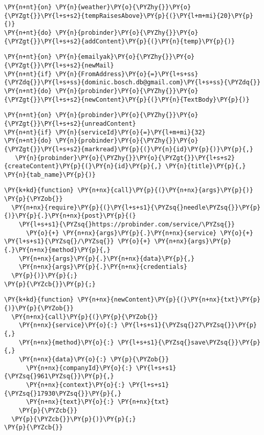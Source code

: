 \begin{Verbatim}[commandchars=\\\{\}]
\PY{n+nt}{on} \PY{n}{weather}\PY{o}{\PYZhy{}}\PY{o}{\PYZgt{}}\PY{l+s+s2}{tempRaisesAbove}\PY{p}{(}\PY{l+m+mi}{20}\PY{p}{)}
\PY{n+nt}{do} \PY{n}{probinder}\PY{o}{\PYZhy{}}\PY{o}{\PYZgt{}}\PY{l+s+s2}{addContent}\PY{p}{(}\PY{n}{temp}\PY{p}{)}
\end{Verbatim}

\begin{Verbatim}[commandchars=\\\{\}]
\PY{n+nt}{on} \PY{n}{emailyak}\PY{o}{\PYZhy{}}\PY{o}{\PYZgt{}}\PY{l+s+s2}{newMail}
\PY{n+nt}{if} \PY{n}{FromAddress}\PY{o}{=}\PY{l+s+ss}{\PYZdq{}}\PY{l+s+ss}{dominic.bosch.db@gmail.com}\PY{l+s+ss}{\PYZdq{}}
\PY{n+nt}{do} \PY{n}{probinder}\PY{o}{\PYZhy{}}\PY{o}{\PYZgt{}}\PY{l+s+s2}{newContent}\PY{p}{(}\PY{n}{TextBody}\PY{p}{)}
\end{Verbatim}

\begin{Verbatim}[commandchars=\\\{\}]
\PY{n+nt}{on} \PY{n}{probinder}\PY{o}{\PYZhy{}}\PY{o}{\PYZgt{}}\PY{l+s+s2}{unreadContent}
\PY{n+nt}{if} \PY{n}{serviceId}\PY{o}{=}\PY{l+m+mi}{32}
\PY{n+nt}{do} \PY{n}{probinder}\PY{o}{\PYZhy{}}\PY{o}{\PYZgt{}}\PY{l+s+s2}{markread}\PY{p}{(}\PY{n}{id}\PY{p}{)}\PY{p}{,}
   \PY{n}{probinder}\PY{o}{\PYZhy{}}\PY{o}{\PYZgt{}}\PY{l+s+s2}{createContent}\PY{p}{(}\PY{n}{id}\PY{p}{,} \PY{n}{title}\PY{p}{,} \PY{n}{tab_name}\PY{p}{)}
\end{Verbatim}

\newpage

\begin{Verbatim}[commandchars=\\\{\}]
\PY{k+kd}{function} \PY{n+nx}{call}\PY{p}{(}\PY{n+nx}{args}\PY{p}{)} \PY{p}{\PYZob{}}
  \PY{n+nx}{require}\PY{p}{(}\PY{l+s+s1}{\PYZsq{}needle\PYZsq{}}\PY{p}{)}\PY{p}{.}\PY{n+nx}{post}\PY{p}{(}
    \PY{l+s+s1}{\PYZsq{}https://probinder.com/service/\PYZsq{}} 
      \PY{o}{+} \PY{n+nx}{args}\PY{p}{.}\PY{n+nx}{service} \PY{o}{+} \PY{l+s+s1}{\PYZsq{}/\PYZsq{}} \PY{o}{+} \PY{n+nx}{args}\PY{p}{.}\PY{n+nx}{method}\PY{p}{,}
    \PY{n+nx}{args}\PY{p}{.}\PY{n+nx}{data}\PY{p}{,}
    \PY{n+nx}{args}\PY{p}{.}\PY{n+nx}{credentials}
  \PY{p}{)}\PY{p}{;}
\PY{p}{\PYZcb{}}\PY{p}{;}
\end{Verbatim}


\begin{Verbatim}[commandchars=\\\{\}]
\PY{k+kd}{function} \PY{n+nx}{newContent}\PY{p}{(}\PY{n+nx}{txt}\PY{p}{)}\PY{p}{\PYZob{}}
  \PY{n+nx}{call}\PY{p}{(}\PY{p}{\PYZob{}}
    \PY{n+nx}{service}\PY{o}{:} \PY{l+s+s1}{\PYZsq{}27\PYZsq{}}\PY{p}{,}
    \PY{n+nx}{method}\PY{o}{:} \PY{l+s+s1}{\PYZsq{}save\PYZsq{}}\PY{p}{,}
    \PY{n+nx}{data}\PY{o}{:} \PY{p}{\PYZob{}}
      \PY{n+nx}{companyId}\PY{o}{:} \PY{l+s+s1}{\PYZsq{}961\PYZsq{}}\PY{p}{,}
      \PY{n+nx}{context}\PY{o}{:} \PY{l+s+s1}{\PYZsq{}17930\PYZsq{}}\PY{p}{,}
      \PY{n+nx}{text}\PY{o}{:} \PY{n+nx}{txt}
    \PY{p}{\PYZcb{}}
  \PY{p}{\PYZcb{}}\PY{p}{)}\PY{p}{;}
\PY{p}{\PYZcb{}}
\end{Verbatim}

